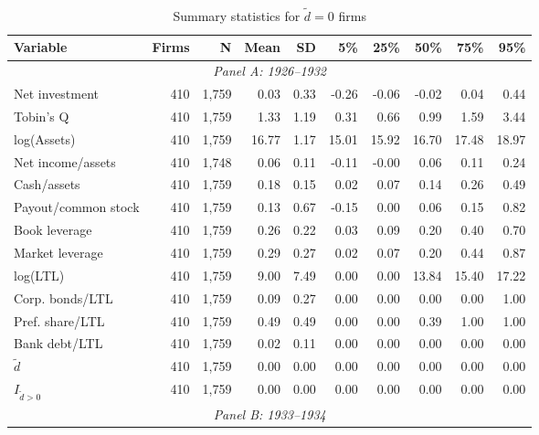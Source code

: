 \begin{table}[p]\centering
    \caption{\\ Summary statistics for $\tilde{d} = 0$ firms}\scriptsize
    \label{tabapp:summary_I_1}
    \begin{threeparttable}
        \begin{tabular}{lrrrrrrrrr}
            \toprule
            Variable & Firms & N & Mean & SD & 5\% & 25\% & 50\% & 75\% & 95\% \\
            \midrule
            \multicolumn{10}{c}{\textit{Panel A: 1926--1932}} \\
            \midrule
            Net investment & 410 & 1,759 & 0.03 & 0.33 & -0.26 & -0.06 & -0.02 & 0.04 & 0.44 \\
            Tobin's Q & 410 & 1,759 & 1.33 & 1.19 & 0.31 & 0.66 & 0.99 & 1.59 & 3.44 \\
            log(Assets) & 410 & 1,759 & 16.77 & 1.17 & 15.01 & 15.92 & 16.70 & 17.48 & 18.97 \\
            Net income/assets & 410 & 1,748 & 0.06 & 0.11 & -0.11 & -0.00 & 0.06 & 0.11 & 0.24 \\
            Cash/assets & 410 & 1,759 & 0.18 & 0.15 & 0.02 & 0.07 & 0.14 & 0.26 & 0.49 \\
            Payout/common stock & 410 & 1,759 & 0.13 & 0.67 & -0.15 & 0.00 & 0.06 & 0.15 & 0.82 \\
            Book leverage & 410 & 1,759 & 0.26 & 0.22 & 0.03 & 0.09 & 0.20 & 0.40 & 0.70 \\
            Market leverage & 410 & 1,759 & 0.29 & 0.27 & 0.02 & 0.07 & 0.20 & 0.44 & 0.87 \\
            log(LTL) & 410 & 1,759 & 9.00 & 7.49 & 0.00 & 0.00 & 13.84 & 15.40 & 17.22 \\
            Corp. bonds/LTL & 410 & 1,759 & 0.09 & 0.27 & 0.00 & 0.00 & 0.00 & 0.00 & 1.00 \\
            Pref. share/LTL & 410 & 1,759 & 0.49 & 0.49 & 0.00 & 0.00 & 0.39 & 1.00 & 1.00 \\
            Bank debt/LTL & 410 & 1,759 & 0.02 & 0.11 & 0.00 & 0.00 & 0.00 & 0.00 & 0.00 \\
            \ensuremath{\tilde{d}} & 410 & 1,759 & 0.00 & 0.00 & 0.00 & 0.00 & 0.00 & 0.00 & 0.00 \\
            \ensuremath{I_{\tilde{d}>0}} & 410 & 1,759 & 0.00 & 0.00 & 0.00 & 0.00 & 0.00 & 0.00 & 0.00 \\
            \midrule
            \multicolumn{10}{c}{\textit{Panel B: 1933--1934}} \\

\end{tabular}
\end{threeparttable}
\end{table}
